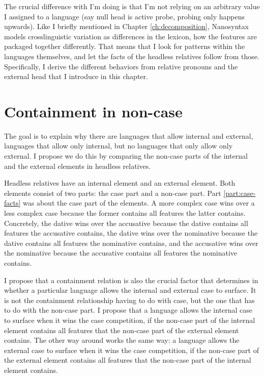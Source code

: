 The crucial difference with I'm doing is that I'm not relying on an arbitrary value I assigned to a language (say null head is active probe, probing only happens upwards). Like I briefly mentioned in Chapter \ref{ch:decomposition}, Nanosyntax models crosslinguistic variation as differences in the lexicon, how the features are packaged together differently. That means that I look for patterns within the languages themselves, and let the facts of the headless relatives follow from those. Specifically, I derive the different behaviors from relative pronouns and the external head that I introduce in this chapter.


\section{Containment in non-case}

The goal is to explain why there are languages that allow internal and external, languages that allow only internal, but no languages that only allow only external. I propose we do this by comparing the non-case parts of the internal and the external elements in headless relatives.

Headless relatives have an internal element and an external element. Both elements consist of two parts: the case part and a non-case part. Part \ref{part:case-facts} was about the case part of the elements. A more complex case wins over a less complex case because the former contains all features the latter contains. Concretely, the dative wins over the accusative because the dative contains all features the accusative contains, the dative wins over the nominative because the dative contains all features the nominative contains, and the accusative wins over the nominative because the accusative contains all features the nominative contains.

I propose that a containment relation is also the crucial factor that determines in whether a particular language allows the internal and external case to surface. It is not the containment relationship having to do with case, but the one that has to do with the non-case part. I propose that a language allows the internal case to surface when it wins the case competition, if the non-case part of the internal element contains all features that the non-case part of the external element contains. The other way around works the same way: a language allows the external case to surface when it wins the case competition, if the non-case part of the external element contains all features that the non-case part of the internal element contains.


